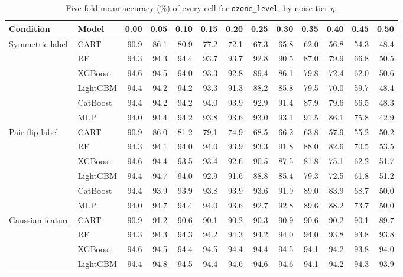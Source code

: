 \begin{table}[p]
\centering
\tiny
\setlength{\tabcolsep}{2.6pt}
\caption{Five-fold mean accuracy (\%) of every cell for \texttt{ozone\_level}, by noise tier $\eta$.}
\label{tab:grid_ozone_level}
\begin{tabular}{@{}llrrrrrrrrrrr@{}}
\toprule
Condition & Model & 0.00 & 0.05 & 0.10 & 0.15 & 0.20 & 0.25 & 0.30 & 0.35 & 0.40 & 0.45 & 0.50 \\
\midrule
Symmetric label & CART & 90.9 & 86.1 & 80.9 & 77.2 & 72.1 & 67.3 & 65.8 & 62.0 & 56.8 & 54.3 & 48.4 \\
 & RF & 94.3 & 94.3 & 94.4 & 93.7 & 93.7 & 92.8 & 90.5 & 87.0 & 79.9 & 66.8 & 50.5 \\
 & XGBoost & 94.6 & 94.5 & 94.0 & 93.3 & 92.8 & 89.4 & 86.1 & 79.8 & 72.4 & 62.0 & 50.6 \\
 & LightGBM & 94.4 & 94.2 & 94.2 & 93.3 & 91.3 & 88.2 & 85.8 & 79.5 & 70.0 & 59.7 & 48.4 \\
 & CatBoost & 94.4 & 94.2 & 94.2 & 94.0 & 93.9 & 92.9 & 91.4 & 87.9 & 79.6 & 66.5 & 48.3 \\
 & MLP & 94.0 & 94.4 & 94.2 & 93.8 & 93.6 & 93.0 & 93.1 & 91.5 & 86.1 & 75.8 & 42.9 \\
\midrule
Pair-flip label & CART & 90.9 & 86.0 & 81.2 & 79.1 & 74.9 & 68.5 & 66.2 & 63.8 & 57.9 & 55.2 & 50.2 \\
 & RF & 94.3 & 94.1 & 94.0 & 94.0 & 93.9 & 93.3 & 91.8 & 88.0 & 82.6 & 70.5 & 53.5 \\
 & XGBoost & 94.6 & 94.4 & 93.5 & 93.4 & 92.6 & 90.5 & 87.5 & 81.8 & 75.1 & 62.2 & 51.7 \\
 & LightGBM & 94.4 & 94.7 & 94.0 & 92.9 & 91.6 & 88.8 & 85.4 & 79.3 & 72.5 & 61.8 & 51.2 \\
 & CatBoost & 94.4 & 93.9 & 93.9 & 93.8 & 93.9 & 93.6 & 91.9 & 89.0 & 83.9 & 68.7 & 50.0 \\
 & MLP & 94.0 & 94.7 & 94.4 & 94.0 & 93.6 & 92.7 & 92.8 & 89.6 & 88.2 & 73.7 & 50.0 \\
\midrule
Gaussian feature & CART & 90.9 & 91.2 & 90.6 & 90.1 & 90.2 & 90.3 & 90.9 & 90.6 & 90.2 & 90.1 & 89.7 \\
 & RF & 94.3 & 94.3 & 94.3 & 94.2 & 94.3 & 94.2 & 94.0 & 94.0 & 93.8 & 93.8 & 93.8 \\
 & XGBoost & 94.6 & 94.5 & 94.4 & 94.5 & 94.4 & 94.4 & 94.5 & 94.1 & 94.2 & 93.8 & 94.0 \\
 & LightGBM & 94.4 & 94.8 & 94.5 & 94.4 & 94.6 & 94.6 & 94.6 & 94.1 & 94.2 & 94.3 & 93.9 \\

\end{tabular}
\end{table}
